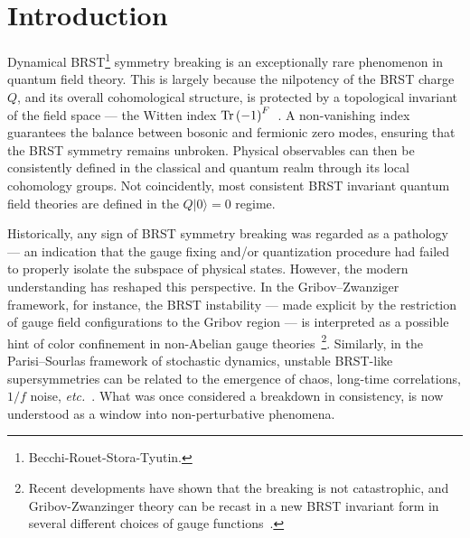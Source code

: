 \documentclass[../main.tex]{subfiles}
\begin{document}
\section{Introduction}%
\label{sec:introduction}

Dynamical BRST\footnote{Becchi-Rouet-Stora-Tyutin.} symmetry breaking is an exceptionally rare phenomenon in quantum field theory. This is largely because the nilpotency of the BRST charge $Q$, and its overall cohomological structure, is protected by a topological invariant of the field space --- the Witten index $\operatorname{Tr} {(-1)}^F$~\cite{witten1981a,witten1982a,fujikawa1983a}. A non-vanishing index guarantees the balance between bosonic and fermionic zero modes, ensuring that the BRST symmetry remains unbroken. Physical observables can then be consistently defined in the classical and quantum realm through its local cohomology groups. Not coincidently, most consistent BRST invariant quantum field theories are defined in the $Q \lvert 0 \rangle = 0$ regime.

Historically, any sign of BRST symmetry breaking was regarded as a pathology --- an indication that the gauge fixing and/or quantization procedure had failed to properly isolate the subspace of physical states. However, the modern understanding has reshaped this perspective. In the Gribov–Zwanziger framework, for instance, the BRST instability --- made explicit by the restriction of gauge field configurations to the Gribov region --- is interpreted as a possible hint of color confinement in non-Abelian gauge theories~\cite{gribov1978a,zwanziger1989a,maggiore1994a,sorella2009a,dudal2012a,vandersickel2012a}\footnote{Recent developments have shown that the breaking is not catastrophic, and Gribov-Zwanzinger theory can be recast in a new BRST invariant form in several different choices of gauge functions~\cite{pereira2015a,capri2015a,pereira2016a,pereira2016b,pereira2016c}.}. Similarly, in the Parisi–Sourlas framework of stochastic dynamics, unstable BRST-like supersymmetries can be related to the emergence of chaos, long-time correlations, $1/f$ noise, \textit{etc.}~\cite{parisi1982a,ovchinnikov2016a,ovchinnikov2025a}. What was once considered a breakdown in consistency, is now understood as a window into non-perturbative phenomena.
\end{document}
